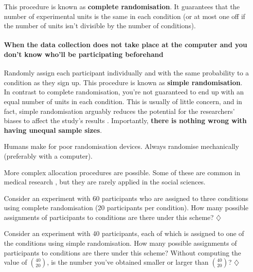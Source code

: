\documentclass[a4paper]{tufte-book}\usepackage[]{graphicx}\usepackage[]{xcolor}
\newcommand*{\parend}[1][$\diamondsuit$]{%
  \unskip\nobreak\hspace{1em plus 1fill}$\diamondsuit$%
}
\begin{document}
This procedure is known as \textbf{complete randomisation}.
It guarantees that the number of experimental units is the same
in each condition (or at most one off if the number of units isn't
divisible by the number of conditions).

\paragraph{When the data collection does not take place
at the computer and you don't know who'll be participating
beforehand}
Randomly assign each participant individually
and with the same probability to a condition as they sign up.
This procedure is known as \textbf{simple randomisation}.
In contrast to complete randomisation, you're not guaranteed to end up
with an equal number of units in each condition. This is usually of little
concern, and in fact, simple randomisation arguably reduces the potential
for the researchers' biases to affect the study's results \citep{Kahan2015}.
Importantly, \textbf{there is nothing wrong with having unequal sample sizes}.

\begin{framed}
 Humans make for poor randomisation devices.
 Always randomise mechanically (preferably with a computer).
\end{framed}

More complex allocation procedures are possible.
Some of these are common in medical research \citep{Rosenberger2016}, 
but they are rarely applied in the social sciences.

  Consider an experiment with 60 participants who are assigned to
  three conditions using complete randomisation (20 participants per condition).
  How many possible assignments of participants to conditions are there under this scheme?
\parend

  Consider an experiment with 40 participants, each of which is assigned
  to one of the conditions using simple randomisation.
  How many possible assignments of participants to conditions are there under this scheme?
  Without computing the value of ${40} \choose {20}$, 
  is the number you've obtained smaller or larger than ${40} \choose {20}$?
\parend
\end{document}
